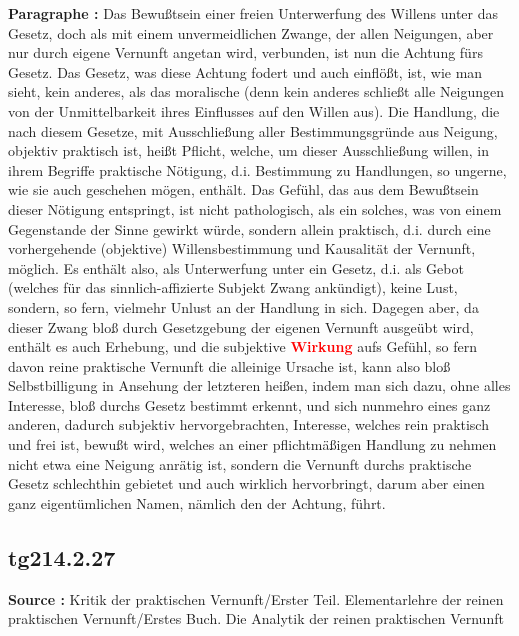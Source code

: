 \documentclass[a4paper,12pt,twoside]{book}
\newcommand{\match}[1]{\textcolor{red}{\textbf{#1}}}
\begin{document}
	\noindent\textbf{Paragraphe : }Das Bewußtsein einer freien Unterwerfung des Willens unter das Gesetz, doch als mit einem unvermeidlichen Zwange, der allen Neigungen, aber nur durch eigene Vernunft angetan wird, verbunden, ist nun die Achtung fürs Gesetz. Das Gesetz, was diese Achtung fodert und auch einflößt, ist, wie man sieht, kein anderes, als das moralische (denn kein anderes schließt alle Neigungen von der Unmittelbarkeit ihres Einflusses auf den Willen aus). Die Handlung, die nach diesem Gesetze, mit Ausschließung aller Bestimmungsgründe aus Neigung, objektiv praktisch ist, heißt Pflicht, welche, um dieser Ausschließung willen, in ihrem Begriffe praktische Nötigung, d.i. Bestimmung zu Handlungen, so ungerne, wie sie auch geschehen mögen, enthält. Das Gefühl, das aus dem Bewußtsein dieser Nötigung entspringt, ist nicht pathologisch, als ein solches, was von einem Gegenstande der Sinne gewirkt würde, sondern allein praktisch, d.i. durch eine vorhergehende (objektive) Willensbestimmung und Kausalität der Vernunft, möglich. Es enthält also, als Unterwerfung unter ein Gesetz, d.i. als Gebot (welches für das sinnlich-affizierte Subjekt Zwang ankündigt), keine Lust, sondern, so fern, vielmehr Unlust an der Handlung in sich. Dagegen aber, da dieser Zwang bloß durch Gesetzgebung der eigenen Vernunft ausgeübt wird, enthält es auch Erhebung, und die subjektive \match{Wirkung} aufs Gefühl, so fern davon reine praktische Vernunft die alleinige Ursache ist, kann also bloß Selbstbilligung in Ansehung der letzteren heißen, indem man sich dazu, ohne alles Interesse, bloß durchs Gesetz bestimmt erkennt, und sich nunmehro eines ganz anderen, dadurch subjektiv hervorgebrachten, Interesse, welches rein praktisch und frei ist, bewußt wird, welches an einer pflichtmäßigen Handlung zu nehmen nicht etwa eine Neigung anrätig ist, sondern die Vernunft durchs praktische Gesetz schlechthin gebietet und auch wirklich hervorbringt, darum aber einen ganz eigentümlichen Namen, nämlich den der Achtung, führt. 
	
	\subsection*{tg214.2.27} 
	\textbf{Source : }Kritik der praktischen Vernunft/Erster Teil. Elementarlehre der reinen praktischen Vernunft/Erstes Buch. Die Analytik der reinen praktischen Vernunft\\  
	
\end{document}
